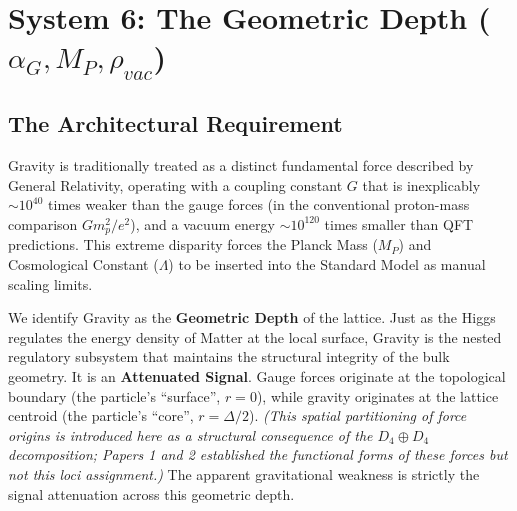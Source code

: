 \section{System 6: The Geometric Depth \texorpdfstring{($\alpha_G, M_P, \rho_{vac}$)}{(alphaG, MP, rhovac)}}
\label{sec:geometric_depth}





\subsection{The Architectural Requirement}
Gravity is traditionally treated as a distinct fundamental force described by General Relativity, operating with a coupling constant $G$ that is inexplicably $\sim\!10^{40}$ times weaker than the gauge forces (in the conventional proton-mass comparison $G m_p^2/e^2$), and a vacuum energy $\sim\!10^{120}$ times smaller than QFT predictions. This extreme disparity forces the Planck Mass ($M_P$) and Cosmological Constant ($\Lambda$) to be inserted into the Standard Model as manual scaling limits.

We identify Gravity as the \textbf{Geometric Depth} of the lattice. Just as the Higgs regulates the energy density of Matter at the local surface, Gravity is the nested regulatory subsystem that maintains the structural integrity of the bulk geometry. It is an \textbf{Attenuated Signal}. Gauge forces originate at the topological boundary (the particle's ``surface'', $r=0$), while gravity originates at the lattice centroid (the particle's ``core'', $r=\Delta/2$). \textit{(This spatial partitioning of force origins is introduced here as a structural consequence of the $D_4 \oplus D_4$ decomposition; Papers 1 and 2 established the functional forms of these forces but not this loci assignment.)} The apparent gravitational weakness is strictly the signal attenuation across this geometric depth.

